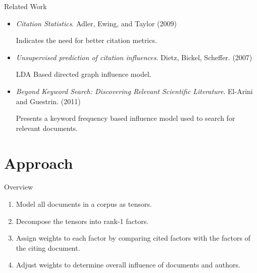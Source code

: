 \documentclass[handout]{beamer}
\begin{document}
\begin{frame}{Related Work}
    \begin{itemize}[<+->]
        \item {\em Citation Statistics}. Adler, Ewing, and Taylor (2009)
            \par Indicates the need for better citation metrics.\cite{adler2009}
        \item {\em Unsupervised prediction of citation influences}.  Dietz, Bickel, Scheffer. (2007)\cite{dietz2007}
            \par LDA Based directed graph influence model.
        \item {\em Beyond Keyword Search: Discovering Relevant Scientific Literature}. El-Arini and Guestrin. (2011)\cite{el-arini2011}
            \par Presents a keyword frequency based influence model used to search for relevant documents.
    \end{itemize}
\end{frame}


\section{Approach}

\begin{frame}{Overview}
    \begin{enumerate}[<+->]
        \item Model all documents in a corpus as tensors.
        \item Decompose the tensors into rank-1 factors.
        \item Assign weights to each factor by comparing cited factors with the factors of the citing document.
        \item Adjust weights to determine overall influence of documents and authors.
    \end{enumerate}
\end{frame}
\end{document}
